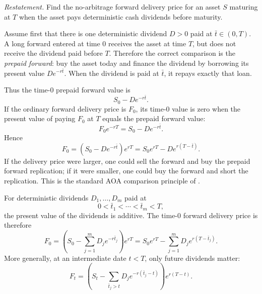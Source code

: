 \begin{exercise}
\emph{Restatement.}  Find the no-arbitrage forward delivery price for an
asset \(S\) maturing at \(T\) when the asset pays deterministic cash dividends
before maturity.
\end{exercise}

\begin{solution}
Assume first that there is one deterministic dividend \(D>0\) paid at
\(\bar t\in(0,T)\).  A long forward entered at time \(0\) receives the asset at
time \(T\), but does not receive the dividend paid before \(T\).  Therefore the
correct comparison is the \emph{prepaid forward}: buy the asset today and
finance the dividend by borrowing its present value \(De^{-r\bar t}\).  When
the dividend is paid at \(\bar t\), it repays exactly that loan.

Thus the time-0 prepaid forward value is
\[
  S_0-De^{-r\bar t}.
\]
If the ordinary forward delivery price is \(F_0\), its time-0 value is zero
when the present value of paying \(F_0\) at \(T\) equals the prepaid forward
value:
\[
  F_0e^{-rT}=S_0-De^{-r\bar t}.
\]
Hence
\[
  \boxed{
  F_0=(S_0-De^{-r\bar t})e^{rT}
      =S_0e^{rT}-De^{r(T-\bar t)}.
  }
\]
If the delivery price were larger, one could sell the forward and buy the
prepaid forward replication; if it were smaller, one could buy the forward
and short the replication.  This is the standard AOA comparison principle of
.

For deterministic dividends \(D_1,\ldots,D_m\) paid at
\[
  0<\bar t_1<\cdots<\bar t_m<T,
\]
the present value of the dividends is additive.  The time-0 forward delivery
price is therefore
\[
  \boxed{
  F_0
  =
  \left(S_0-\sum_{j=1}^m D_j e^{-r\bar t_j}\right)e^{rT}
  =
  S_0e^{rT}
  -
  \sum_{j=1}^m D_j e^{r(T-\bar t_j)}.
  }
\]
More generally, at an intermediate date \(t<T\), only future dividends matter:
\[
  F_t
  =
  \left(
    S_t-\sum_{\bar t_j>t}D_j e^{-r(\bar t_j-t)}
  \right)e^{r(T-t)}.
\]
\end{solution}
